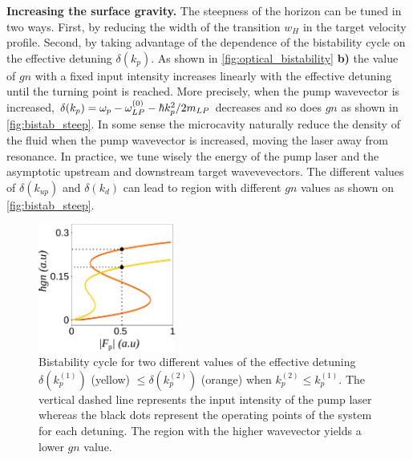 \bigskip

\textbf{Increasing the surface gravity.}
The steepness of the horizon can be tuned in two ways. First, by reducing the width of the transition $w_H$ in the target velocity profile.
Second, by taking advantage of the dependence of the bistability cycle on the effective detuning $\delta(k_p)$.
As shown in \autoref{fig:optical_bistability} \textbf{b)} the value of $gn$ with a fixed input intensity increases linearly with the effective detuning until the turning point is reached. More precisely,
when the pump wavevector is increased,  $\delta(k_p) = \omega_p-\omega_{LP}^{(0)}- \hbar k_p^2/2m_{LP}$ decreases and so does $gn$ as shown in \autoref{fig:bistab_steep}. In some
sense the microcavity naturally reduce the density of the fluid when the pump wavevector is increased, moving the laser away from resonance.
In practice, we tune wisely the energy of the pump laser and the asymptotic upstream and downstream target wavevevectors. The different values of $\delta(k_{up})$ and $\delta(k_{d})$ can
lead to region with different $gn$ values as shown on \autoref{fig:bistab_steep}.


\begin{figure}[h]
    \centering
    \includegraphics[width=0.4\textwidth]{chap_custom_st/fig/bistab_to_gn.pdf}
    \caption{Bistability cycle for two different values of the effective detuning $\delta(k^{(1)}_p)$ (yellow) $\leq \delta(k^{(2)}_p) $ (orange) when $k^{(2)}_p \leq k^{(1)}_p $. The vertical dashed line
    represents the input intensity of the pump laser whereas the black dots represent the operating points of the system for each detuning. The region with the higher wavevector
    yields a lower $gn$ value.}
    \label{fig:bistab_steep}
\end{figure}

